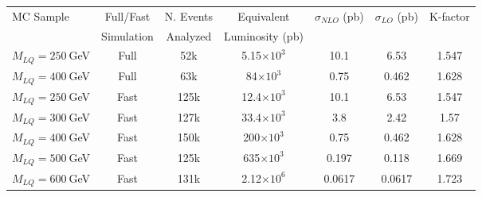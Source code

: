 \begin{table}[htb]
  \label{tab:NumEvents}
  \begin{center}
    \begin{tabular}{|l|cccccc|} \hline\hline
      MC Sample                   & Full/Fast & N. Events & Equivalent             & $\sigma_{NLO}$ (pb) & $\sigma_{LO}$ (pb) & K-factor \\
                                  & Simulation& Analyzed  & Luminosity (pb)        &                     &                    &    \\ 
\hline\hline
      $M_{LQ}=250~$GeV            & Full      & 52k       &    5.15$\times 10^3$   & 10.1                & 6.53               & 1.547\\
      $M_{LQ}=400~$GeV            & Full      & 63k       &      84$\times 10^3$   &  0.75		 & 0.462	      & 1.628\\ 
\hline
      $M_{LQ}=250~$GeV            & Fast      & 125k      &    12.4$\times 10^3$   & 10.1		 & 6.53		      & 1.547\\
      $M_{LQ}=300~$GeV            & Fast      & 127k      &    33.4$\times 10^3$   &  3.8	         & 2.42		      & 1.57\\
      $M_{LQ}=400~$GeV            & Fast      & 150k      &     200$\times 10^3$   &  0.75	         & 0.462	      & 1.628\\
      $M_{LQ}=500~$GeV            & Fast      & 125k      &     635$\times 10^3$   &  0.197  	         & 0.118	      & 1.669\\
      $M_{LQ}=600~$GeV            & Fast      & 131k      &    2.12$\times 10^6$   &  0.0617             & 0.0617             & 1.723\\

\end{tabular}
\end{center}
\end{table}
